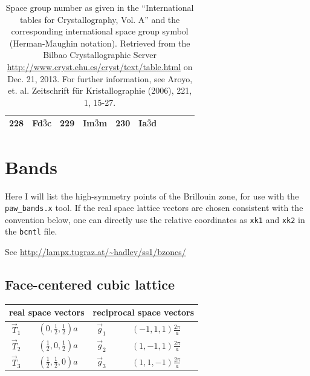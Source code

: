\documentclass[final,12pt,makeidx,DIV=calc]{article}
\begin{document}
{{{\begin{table}[!h]
\begin{center}
\begin{tabular}{||r|l||r|l||r|l||r|l||r|l||}
228    & Fd$\bar{3}$c       & 
229    & Im$\bar{3}$m       & 
230    & Ia$\bar{3}$d       \\
\hline
\end{tabular}
\end{center}
\caption{\label{table:spacegroupnumber_b}Space group number as given
  in the ``International tables for Crystallography, Vol. A'' and the
  corresponding international space group symbol (Herman-Maughin
  notation). Retrieved from the Bilbao Crystallographic Server
  \url{http://www.cryst.ehu.es/cryst/text/table.html} on Dec. 21,
  2013.  For further information, see Aroyo, et. al. Zeitschrift f\"ur
  Kristallographie (2006), 221, 1, 15-27.  }
\end{table}


\newpage
\section{Bands}
Here I will list the high-symmetry points of the Brillouin zone, for
use with the \verb|paw_bands.x| tool. If the real space lattice vectors are
chosen consistent with the convention below, one can directly use the
relative coordinates as \verb|xk1| and \verb|xk2| in the \verb|bcntl|
file.

See \url{http://lampx.tugraz.at/~hadley/ss1/bzones/}

\subsection{Face-centered cubic lattice}
\begin{center}
\renewcommand\arraystretch{1.5}
\begin{tabular}{||c|c||c|c||}
\hline
\multicolumn{2}{|c|}{real space vectors} &
\multicolumn{2}{|c|}{reciprocal space vectors} \\
\hline
$\vec{T}_1$ & $(0,\frac{1}{2},\frac{1}{2}) a$ &
$\vec{g}_1$ & $(-1,1,1)\frac{2\pi}{a}$ \\
$\vec{T}_2$ & $(\frac{1}{2},0,\frac{1}{2}) a$ &
$\vec{g}_2$ & $(1,-1,1)\frac{2\pi}{a}$ \\
$\vec{T}_3$ & $(\frac{1}{2},\frac{1}{2},0) a$ &
$\vec{g}_3$ & $(1,1,-1)\frac{2\pi}{a}$ \\
\hline
\end{tabular}
\renewcommand\arraystretch{1.}
\end{center}

}}}
\end{document}
